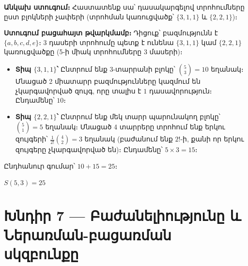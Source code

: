 \documentclass[12pt, a4paper]{article}
\begin{document}
\textbf{Անկախ ստուգում։}\; Հաստատենք սա՝ դասակարգելով տրոհումները ըստ բլոկների չափերի (տրոհման կառուցվածք՝ $\{3,1,1\}$ և $\{2,2,1\}$)։

\textbf{Ստուգում բացահայտ թվարկմամբ։}\;
Դիցուք՝ բազմությունն է $\{a,b,c,d,e\}$։ 3 դասերի տրոհումը պետք է ունենա $\{3,1,1\}$ կամ $\{2,2,1\}$ կառուցվածքը (5-ի միակ տրոհումները 3 մասերի)։

\begin{itemize}[nosep]
  \item \textbf{Տիպ $\{3,1,1\}$՝}\;
        Ընտրում ենք 3-տարրանի բլոկը՝ $\binom{5}{3} = 10$ եղանակ։
        Մնացած 2 միատարր բազմությունները կազմում են չկարգավորված զույգ, որը տալիս է $1$ դասավորություն։
        Ընդամենը՝ $10$։
  \item \textbf{Տիպ $\{2,2,1\}$՝}\;
        Ընտրում ենք մեկ տարր պարունակող բլոկը՝ $\binom{5}{1} = 5$ եղանակ։
        Մնացած 4 տարրերը տրոհում ենք երկու զույգերի՝
        $\frac{1}{2!}\binom{4}{2} = 3$ եղանակ (բաժանում ենք $2!$-ի, քանի որ երկու զույգերը
        չկարգավորված են)։
        Ընդամենը՝ $5 \times 3 = 15$։
\end{itemize}

Ընդհանուր գումար՝ $10 + 15 = 25$։ \;\checkmark

\begin{answerbox}
\centering $S(5,3) = \boxed{25}$
\end{answerbox}

\newpage
\section{Խնդիր 7 — Բաժանելիությունը և Ներառման-բացառման սկզբունքը}
\end{document}

